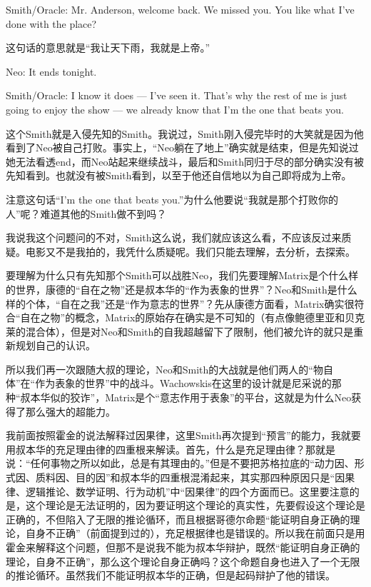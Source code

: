 \documentclass[UTF8]{ctexart}
\newenvironment{myquote}{\color{green} \setlength{\leftskip}{6em} \setlength{\rightskip}{4em} \setlength{\parindent}{-2em}}{\par}
\begin{document}
\begin{myquote}
Smith/Oracle: Mr. Anderson, welcome back. We missed you. You like what I've done with the place?
\end{myquote}

这句话的意思就是“我让天下雨，我就是上帝。”

\begin{myquote}
Neo: It ends tonight.

Smith/Oracle: I know it does --- I've seen it. That's why the rest of me is just going to enjoy the show --- we already know that I'm the one that beats you.
\end{myquote}

这个Smith就是入侵先知的Smith。我说过，Smith刚入侵完毕时的大笑就是因为他看到了Neo被自己打败。事实上，“Neo躺在了地上”确实就是结束，但是先知说过她无法看透end，而Neo站起来继续战斗，最后和Smith同归于尽的部分确实没有被先知看到。也就没有被Smith看到，以至于他还自信地以为自己即将成为上帝。

注意这句话“I'm the one that beats you.”为什么他要说“我就是那个打败你的人”呢？难道其他的Smith做不到吗？

我说我这个问题问的不对，Smith这么说，我们就应该这么看，不应该反过来质疑。电影又不是我拍的，我凭什么质疑呢。我们只能去理解，去分析，去探索。

要理解为什么只有先知那个Smith可以战胜Neo，我们先要理解Matrix是个什么样的世界，康德的“自在之物”还是叔本华的“作为表象的世界”？Neo和Smith是什么样的个体，“自在之我”还是“作为意志的世界”？先从康德方面看，Matrix确实很符合“自在之物”的概念，Matrix的原始存在确实是不可知的（有点像鲍德里亚和贝克莱的混合体），但是对Neo和Smith的自我超越留下了限制，他们被允许的就只是重新规划自己的认识。

所以我们再一次跟随大叔的理论，Neo和Smith的大战就是他们两人的“物自体”在“作为表象的世界”中的战斗。Wachowskis在这里的设计就是尼采说的那种“叔本华似的狡诈”，Matrix是个“意志作用于表象”的平台，这就是为什么Neo获得了那么强大的超能力。

我前面按照霍金的说法解释过因果律，这里Smith再次提到“预言”的能力，我就要用叔本华的充足理由律的四重根来解读。首先，什么是充足理由律？那就是说：“任何事物之所以如此，总是有其理由的。”但是不要把苏格拉底的“动力因、形式因、质料因、目的因”和叔本华的四重根混淆起来，其实那四种原因只是“因果律、逻辑推论、数学证明、行为动机”中“因果律”的四个方面而已。这里要注意的是，这个理论是无法证明的，因为要证明这个理论的真实性，先要假设这个理论是正确的，不但陷入了无限的推论循环，而且根据哥德尔命题“能证明自身正确的理论，自身不正确”（前面提到过的），充足根据律也是错误的。所以我在前面只是用霍金来解释这个问题，但那不是说我不能为叔本华辩护，既然“能证明自身正确的理论，自身不正确”，那么这个理论自身正确吗？这个命题自身也进入了一个无限的推论循环。虽然我们不能证明叔本华的正确，但是起码辩护了他的错误。
\end{document}
